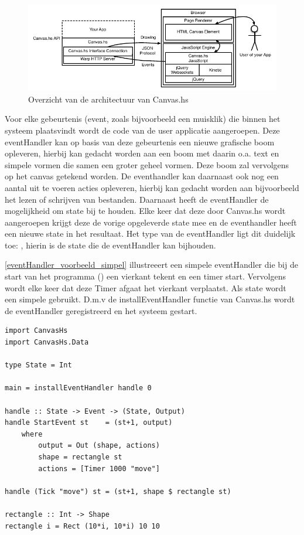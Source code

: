 \begin{figure}[H]
\begin{center}
\includegraphics[keepaspectratio,width=\textwidth]{./images/architectuur_overzicht.pdf}
\caption{Overzicht van de architectuur van Canvas.hs}
\label{fig:overzicht_architectuur}
\end{center}
\end{figure}


Voor elke gebeurtenis (event, zoals bijvoorbeeld een muisklik) die binnen het systeem plaatsvindt wordt de code van de user applicatie aangeroepen. Deze eventHandler kan op basis van deze gebeurtenis een nieuwe grafische boom opleveren, hierbij kan gedacht worden aan een boom met daarin o.a. text en simpele vormen die samen een groter geheel vormen. Deze boom zal vervolgens op het canvas getekend worden. De eventhandler kan daarnaast ook nog een aantal uit te voeren acties opleveren, hierbij kan gedacht worden aan bijvoorbeeld het lezen of schrijven van bestanden. Daarnaast heeft de eventHandler de mogelijkheid om state bij te houden. Elke keer dat deze door Canvas.hs wordt aangeroepen krijgt deze de vorige opgeleverde state mee en de eventhandler heeft een nieuwe state in het resultaat. Het type van de eventHandler ligt dit duidelijk toe: , hierin is  de state die de eventHandler kan bijhouden. 


\autoref{eventHandler_voorbeeld_simpel} illustreeert een simpele eventHandler die bij de start van het programma () een vierkant tekent en een timer start. Vervolgens wordt elke keer dat deze Timer afgaat het vierkant verplaatst. Als state wordt een simpele  gebruikt. D.m.v de installEventHandler functie van Canvas.hs wordt de eventHandler geregistreerd en het systeem gestart.

\begin{lstlisting}[caption=Voorbeeld van een simpele eventHandler, label=eventHandler_voorbeeld_simpel]
import CanvasHs
import CanvasHs.Data

type State = Int

main = installEventHandler handle 0

handle :: State -> Event -> (State, Output)
handle StartEvent st 	= (st+1, output)
	where 
		output = Out (shape, actions)
		shape = rectangle st
		actions = [Timer 1000 "move"]
		
handle (Tick "move") st	= (st+1, shape $ rectangle st)
		
rectangle :: Int -> Shape
rectangle i = Rect (10*i, 10*i) 10 10
\end{lstlisting}


